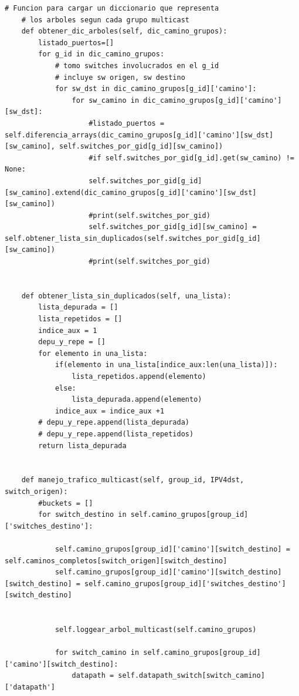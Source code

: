 \documentclass[12pt,a4paper,oneside]{book}
\begin{document}
\begin{lstlisting}[style=codigobase,  label = cod_correrP, caption= controlador.py]
    # Funcion para cargar un diccionario que representa
    # los arboles segun cada grupo multicast
    def obtener_dic_arboles(self, dic_camino_grupos):
        listado_puertos=[]
        for g_id in dic_camino_grupos:
            # tomo switches involucrados en el g_id
            # incluye sw origen, sw destino
            for sw_dst in dic_camino_grupos[g_id]['camino']:
                for sw_camino in dic_camino_grupos[g_id]['camino'][sw_dst]:
                    #listado_puertos = self.diferencia_arrays(dic_camino_grupos[g_id]['camino'][sw_dst][sw_camino], self.switches_por_gid[g_id][sw_camino])
                    #if self.switches_por_gid[g_id].get(sw_camino) != None:
                    self.switches_por_gid[g_id][sw_camino].extend(dic_camino_grupos[g_id]['camino'][sw_dst][sw_camino])
                    #print(self.switches_por_gid)
                    self.switches_por_gid[g_id][sw_camino] = self.obtener_lista_sin_duplicados(self.switches_por_gid[g_id][sw_camino])
                    #print(self.switches_por_gid)


    def obtener_lista_sin_duplicados(self, una_lista):
        lista_depurada = []
        lista_repetidos = []
        indice_aux = 1
        depu_y_repe = []
        for elemento in una_lista:
            if(elemento in una_lista[indice_aux:len(una_lista)]):
                lista_repetidos.append(elemento)
            else:
                lista_depurada.append(elemento)
            indice_aux = indice_aux +1
        # depu_y_repe.append(lista_depurada)
        # depu_y_repe.append(lista_repetidos)
        return lista_depurada


    def manejo_trafico_multicast(self, group_id, IPV4dst, switch_origen):
        #buckets = []
        for switch_destino in self.camino_grupos[group_id]['switches_destino']:

            self.camino_grupos[group_id]['camino'][switch_destino] = self.caminos_completos[switch_origen][switch_destino]
            self.camino_grupos[group_id]['camino'][switch_destino][switch_destino] = self.camino_grupos[group_id]['switches_destino'][switch_destino]


            self.loggear_arbol_multicast(self.camino_grupos)

            for switch_camino in self.camino_grupos[group_id]['camino'][switch_destino]:
                datapath = self.datapath_switch[switch_camino]['datapath']


\end{lstlisting}
\end{document}
